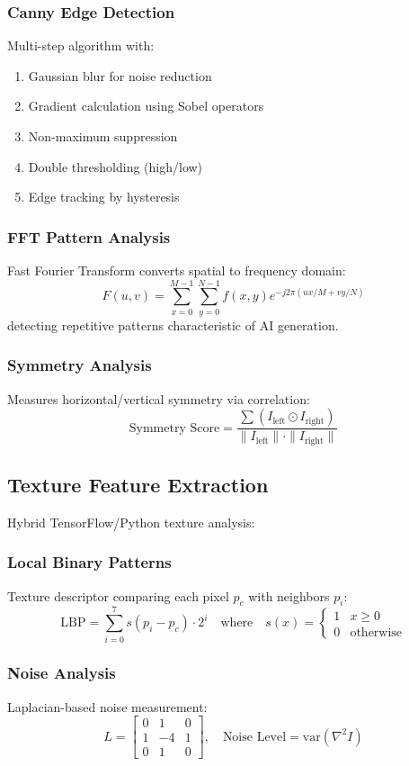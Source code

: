 \documentclass[runningheads]{llncs}
\begin{document}
\subsubsection{Canny Edge Detection}
Multi-step algorithm with:
\begin{enumerate}
    \item Gaussian blur for noise reduction
    \item Gradient calculation using Sobel operators
    \item Non-maximum suppression
    \item Double thresholding (high/low)
    \item Edge tracking by hysteresis
\end{enumerate}

\subsubsection{FFT Pattern Analysis}
Fast Fourier Transform converts spatial to frequency domain:
\[
F(u,v) = \sum_{x=0}^{M-1}\sum_{y=0}^{N-1} f(x,y)e^{-j2\pi(ux/M + vy/N)}
\]
detecting repetitive patterns characteristic of AI generation.

\subsubsection{Symmetry Analysis}
Measures horizontal/vertical symmetry via correlation:
\[
\text{Symmetry Score} = \frac{\sum (I_{\text{left}} \odot I_{\text{right}})}{\|I_{\text{left}}\| \cdot \|I_{\text{right}}\|}
\]

\subsection{Texture Feature Extraction}
Hybrid TensorFlow/Python texture analysis:

\subsubsection{Local Binary Patterns}
Texture descriptor comparing each pixel $p_c$ with neighbors $p_i$:
\[
\text{LBP} = \sum_{i=0}^{7} s(p_i - p_c) \cdot 2^i \quad \text{where} \quad s(x) = \begin{cases} 1 & x \geq 0 \\ 0 & \text{otherwise} \end{cases}
\]

\subsubsection{Noise Analysis}
Laplacian-based noise measurement:
\[
L = \begin{bmatrix} 0 & 1 & 0 \\ 1 & -4 & 1 \\ 0 & 1 & 0 \end{bmatrix}, \quad \text{Noise Level} = \text{var}(\nabla^2 I)
\]
\end{document}
